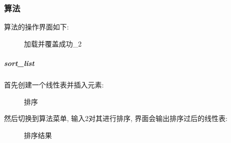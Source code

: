 \documentclass[supercite]{Experimental_Report}
\theoremstyle{definition}
\begin{document}
\newpage

\subsubsection{算法}
\noindent
算法的操作界面如下:
\begin{figure}[htbp]
	\centering
	\centering
	\caption{加载并覆盖成功\_2}
	\label{fig4-1}
\end{figure}

\subparagraph{sort\_list}
\noindent
首先创建一个线性表并插入元素:
\begin{figure}[htbp]
	\centering
	\centering
	\caption{排序}
	\label{fig4-2}
\end{figure}

\noindent
然后切换到算法菜单, 输入2对其进行排序, 界面会输出排序过后的线性表:
\begin{figure}[htbp]
	\centering
	\centering
	\caption{排序结果}
	\label{fig4-3}
\end{figure}
\end{document}
